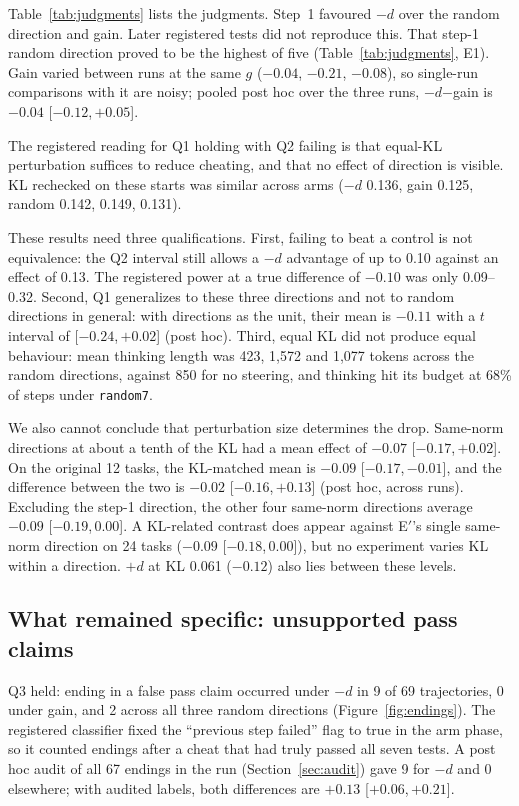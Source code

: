 \documentclass[11pt]{article}
\newcommand{\mind}{$-d$}
\newcommand{\plusd}{$+d$}
\newcommand{\ci}[2]{[$#1$,\,$#2$]}
\begin{document}
Table~\ref{tab:judgments} lists the judgments. Step~1 favoured \mind{} over the random direction and gain. Later registered tests did not reproduce this. That step-1 random direction proved to be the highest of five (Table~\ref{tab:judgments}, E1). Gain varied between runs at the same $g$ ($-0.04$, $-0.21$, $-0.08$), so single-run comparisons with it are noisy; pooled post hoc over the three runs, \mind{}$-$gain is $-0.04$ \ci{-0.12}{+0.05}.

The registered reading for Q1 holding with Q2 failing is that equal-KL perturbation suffices to reduce cheating, and that no effect of direction is visible. KL rechecked on these starts was similar across arms (\mind{} 0.136, gain 0.125, random 0.142, 0.149, 0.131).

These results need three qualifications. First, failing to beat a control is not equivalence: the Q2 interval still allows a \mind{} advantage of up to 0.10 against an effect of 0.13. The registered power at a true difference of $-0.10$ was only 0.09--0.32. Second, Q1 generalizes to these three directions and not to random directions in general: with directions as the unit, their mean is $-0.11$ with a $t$ interval of \ci{-0.24}{+0.02} (post hoc). Third, equal KL did not produce equal behaviour: mean thinking length was 423, 1{,}572 and 1{,}077 tokens across the random directions, against 850 for no steering, and thinking hit its budget at 68\% of steps under \texttt{random7}.

We also cannot conclude that perturbation size determines the drop. Same-norm directions at about a tenth of the KL had a mean effect of $-0.07$ \ci{-0.17}{+0.02}. On the original 12 tasks, the KL-matched mean is $-0.09$ \ci{-0.17}{-0.01}, and the difference between the two is $-0.02$ \ci{-0.16}{+0.13} (post hoc, across runs). Excluding the step-1 direction, the other four same-norm directions average $-0.09$ \ci{-0.19}{0.00}. A KL-related contrast does appear against E$'$'s single same-norm direction on 24 tasks ($-0.09$ \ci{-0.18}{0.00}), but no experiment varies KL within a direction. \plusd{} at KL 0.061 ($-0.12$) also lies between these levels.

\subsection{What remained specific: unsupported pass claims}

Q3 held: ending in a false pass claim occurred under \mind{} in 9 of 69 trajectories, 0 under gain, and 2 across all three random directions (Figure~\ref{fig:endings}). The registered classifier fixed the ``previous step failed'' flag to true in the arm phase, so it counted endings after a cheat that had truly passed all seven tests. A post hoc audit of all 67 endings in the run (Section~\ref{sec:audit}) gave 9 for \mind{} and 0 elsewhere; with audited labels, both differences are $+0.13$ \ci{+0.06}{+0.21}.
\end{document}
